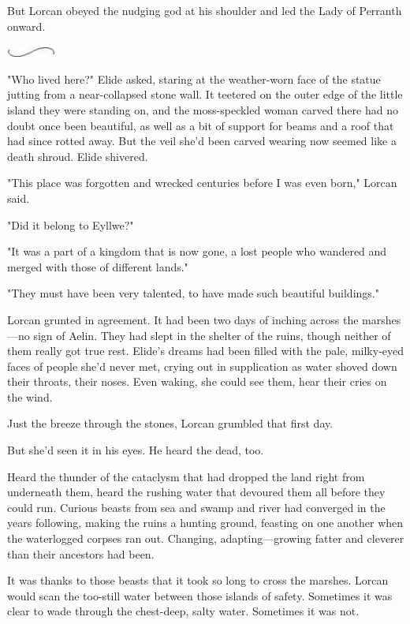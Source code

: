 But Lorcan obeyed the nudging god at his shoulder and led the Lady of Perranth onward.

\begin{center}
	\includegraphics[width=0.65in,height=0.13in]{images/seperator}
\end{center}

"Who lived here?"
Elide asked, staring at the weather-worn face of the statue jutting from a near-collapsed stone wall.
It teetered on the outer edge of the little island they were standing on, and the moss-speckled woman carved there had no doubt once been beautiful, as well as a bit of support for beams and a roof that had since rotted away.
But the veil she'd been carved wearing now seemed like a death shroud.
Elide shivered.

"This place was forgotten and wrecked centuries before I was even born," Lorcan said.

"Did it belong to Eyllwe?"

"It was a part of a kingdom that is now gone, a lost people who wandered and merged with those of different lands."

"They must have been very talented, to have made such beautiful buildings."

Lorcan grunted in agreement.
It had been two days of inching across the marshes---no sign of Aelin.
They had slept in the shelter of the ruins, though neither of them really got true rest.
Elide's dreams had been filled with the pale, milky-eyed faces of people she'd never met, crying out in supplication as water shoved down their throats, their noses.
Even waking, she could see them, hear their cries on the wind.

Just the breeze through the stones, Lorcan grumbled that first day.

But she'd seen it in his eyes.
He heard the dead, too.

Heard the thunder of the cataclysm that had dropped the land right from underneath them, heard the rushing water that devoured them all before they could run.
Curious beasts from sea and swamp and river had converged in the years following, making the ruins a hunting ground, feasting on one another when the waterlogged corpses ran out.
Changing, adapting---growing fatter and cleverer than their ancestors had been.

It was thanks to those beasts that it took so long to cross the marshes.
Lorcan would scan the too-still water between those islands of safety.
Sometimes it was clear to wade through the chest-deep, salty water.
Sometimes it was not.

